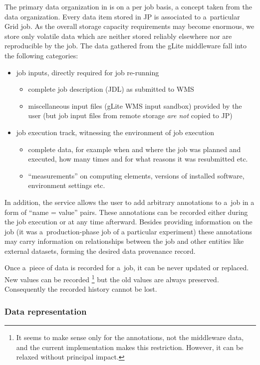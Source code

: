 The primary data organization in \JP is on a per job basis, a concept
taken from the \LB data organization. Every data item stored in JP is
associated to a~particular Grid job. As the overall storage capacity
requirements may become enormous, we store only volatile data which are
neither stored reliably elsewhere nor are reproducible by the job.
The data gathered from the gLite middleware fall into the following categories:
\begin{itemize}
\item job inputs, directly required for job re-running
\begin{itemize}
\item complete job description (JDL) as submitted to WMS
\item miscellaneous input files (gLite WMS input sandbox) provided by the user
(but job input files from remote storage \emph{are not} copied to JP)
\end{itemize}
\item job execution track, witnessing the environment of job execution
\begin{itemize}
\item complete \LB data, for example when and where the job was
  planned and executed, how many times and for what reasons it was
  resubmitted etc.
\item ``measurements'' on computing elements, \eg versions of installed
software, environment settings etc.
\end{itemize}
\end{itemize}
In addition, the service allows the user to add arbitrary annotations to
a~job in a form of ``name = value'' pairs.
These annotations can be recorded either during the job execution or at any time
afterward.
Besides providing information on the job (\eg it was a~production-phase
job of a particular experiment) these annotations may carry 
information on relationships between the job and other entities
like external datasets, forming the desired data provenance record.

Once a~piece of data is recorded for a~job, it can be never updated or
replaced.
New values can be recorded%
\footnote{It seems to make sense only for the annotations, not the
middleware data, and the current implementation makes this restriction.
However, it can be relaxed without principal impact.}
but the old values are always preserved.
Consequently the recorded history cannot be lost.


\subsubsection{Data representation}%
\label{attrib}

